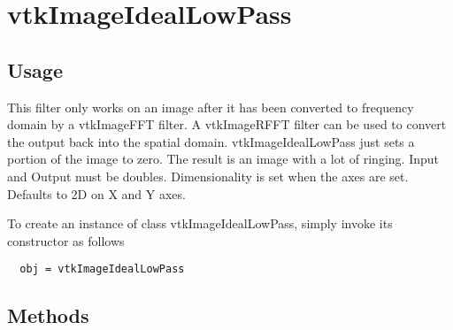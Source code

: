 \section{vtkImageIdealLowPass}

\subsection{Usage}

 This filter only works on an image after it has been converted to
 frequency domain by a vtkImageFFT filter.  A vtkImageRFFT filter
 can be used to convert the output back into the spatial domain.
 vtkImageIdealLowPass just sets a portion of the image to zero.  The result
 is an image with a lot of ringing.  Input and Output must be doubles.
 Dimensionality is set when the axes are set.  Defaults to 2D on X and Y
 axes.

To create an instance of class vtkImageIdealLowPass, simply
invoke its constructor as follows
\begin{verbatim}
  obj = vtkImageIdealLowPass
\end{verbatim}
\subsection{Methods}

